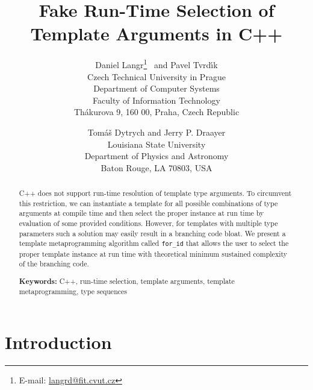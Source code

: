 \documentclass[10pt,a4paper]{article}
\theoremstyle{definition}\newtheorem{problem}{Problem}
\providecommand{\forid}{\texttt{for\_id}\xspace}
\begin{document}
\renewcommand*{\sectionautorefname}{Section}
\newcommand{\problemautorefname}{Problem}
\newcommand{\exampleautorefname}{Example}

\title{Fake Run\hspace{.04em}-\hspace{-.2em}Time Selection of Template Arguments in C++}

\author{Daniel Langr\footnote{E-mail: \href{mailto:langrd@fit.cvut.cz}{langrd@fit.cvut.cz}} \ and Pavel Tvrd{\' \i}k \\
\small Czech Technical University in Prague \\
\small Department of Computer Systems \\
\small Faculty of Information Technology \\
\small Th\'{a}kurova 9, 160 00, Praha, Czech Republic \\
\and
Tom{\' a}{\v s} Dytrych and Jerry P. Draayer \\
\small Louisiana State University \\
\small Department of Physics and Astronomy \\
\small Baton Rouge, LA 70803, USA
}

\date{}

\maketitle

\begin{abstract}
C++ does not support run-time resolution of template type arguments. To circumvent this restriction, we can instantiate a template for all possible combinations of type arguments at compile time and then select the proper instance at run time by evaluation of some provided conditions. However, for templates with multiple type parameters such a solution may easily result in a branching code bloat. We present a template metaprogramming algorithm called \forid that allows the user to select the proper template instance at run time with theoretical minimum sustained complexity of the branching code.

\textbf{Keywords:} C++, run-time selection, template arguments, template metaprogramming, type sequences

\end{abstract}

\section{Introduction}
\label{sec:intro}
\end{document}
